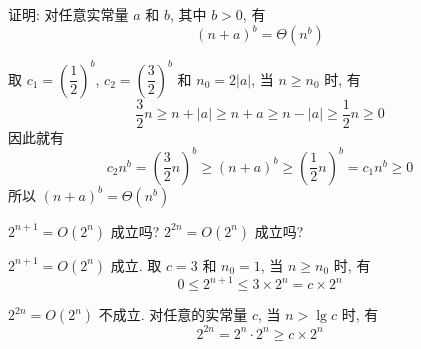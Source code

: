 \documentclass[boxes]{homework}
\begin{document}
\begin{problem}
证明: 对任意实常量 $a$ 和 $b$, 其中 $b > 0$, 有
\begin{equation}
    {(n + a)}^{b} = \Theta \left( n^{b}\right)
\end{equation}
\end{problem}
\begin{solution}
    取 $c_{1} = {\left( \dfrac{ 1 }{ 2 }\right)}^{b}$, $c_{2} = {\left(
                \dfrac{ 3 }{ 2 }\right)}^{b}$ 和 $n_{0} = 2 \left\lvert a
        \right\rvert$, 当 $n \geqslant n_{0}$ 时, 有
    \begin{equation}
        \frac{ 3 }{ 2 } n \geqslant n + \left\lvert a\right\rvert \geqslant
        n + a \geqslant n - \left\lvert a\right\rvert \geqslant
        \frac{ 1 }{ 2 }n \geqslant 0
    \end{equation}
    因此就有
    \begin{equation}
        c_{2} n^{b} = {\left( \frac{ 3 }{ 2 }n\right)}^{b} \geqslant
        {\left( n + a\right)}^{b} \geqslant {\left( \frac{1}{2} n\right)}^{b}
        = c_{1} n^{b} \geqslant 0
    \end{equation}
    所以 ${(n + a)}^{b} = \Theta \left( n^{b}\right)$
\end{solution}

\begin{problem}
$2^{n + 1} = O \left( 2^{n}\right)$ 成立吗? $2^{2n} = O \left( 2^{n}\right)$
成立吗?
\end{problem}
\begin{solution}
    $2^{n + 1} = O\left( 2^{n}\right)$ 成立. 取 $c = 3$ 和 $n_{0} = 1$, 当 $n
        \geqslant n_{0}$ 时, 有
    \begin{equation}
        0 \leqslant 2^{n + 1} \leqslant 3 \times 2^{n} = c \times 2^{n}
    \end{equation}

    $2^{2n} = O \left( 2^{n}\right)$ 不成立. 对任意的实常量 $c$, 当 $n > \lg c$
    时, 有
    \begin{equation}
        2^{2n} = 2^{n} \cdot 2^{n} \geqslant c \times 2^{n}
    \end{equation}
\end{solution}
\end{document}
